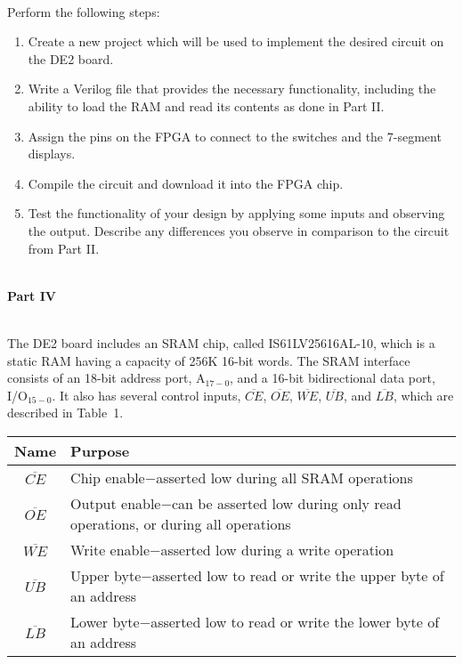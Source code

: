 \documentclass[psfig,10pt,fullpage]{article}
\begin{document}
~\\
Perform the following steps:

\begin{enumerate}
\item Create a new project which will be used to implement the desired
circuit on the DE2 board.
\item Write a Verilog file that provides the necessary functionality,
including the ability to load the RAM and read its contents as done in
Part II.
\item Assign the pins on the FPGA to connect to the switches and the 
7-segment displays.
\item Compile the circuit and download it into the FPGA chip.
\item Test the functionality of your design by applying some inputs
and observing the output. Describe any differences you observe in comparison to the
circuit from Part II.
\end{enumerate}

~\\
\noindent
{\bf Part IV}

~\\
\noindent
The DE2 board includes an SRAM chip, called IS61LV25616AL-10, which is a static RAM having
a capacity of 256K 16-bit words. The SRAM interface consists of an 18-bit address
port, A$_{17-0}$, and a 16-bit bidirectional data port, 
I/O$_{15-0}$. It also has several control inputs,
$\overline{CE}$, $\overline{OE}$, $\overline{WE}$, $\overline{UB}$, and $\overline{LB}$, which 
are described in Table~1.
~\\
\begin{center}
\begin{tabular}{c|l}
Name & Purpose \\ \hline
\rule[-0.075in]{0in}{0.25in} $\overline{CE}$ & Chip enable$-$asserted low during all SRAM operations \\ 
$\overline{OE}$ & Output enable$-$can be asserted low during only read operations, or during all operations \\ 
$\overline{WE}$ & Write enable$-$asserted low during a write operation \\ 
$\overline{UB}$ & Upper byte$-$asserted low to read or write the upper byte of an address \\ 
$\overline{LB}$ & Lower byte$-$asserted low to read or write the lower byte of an address \\ 
\end{tabular}
\end{center}
\end{document}
